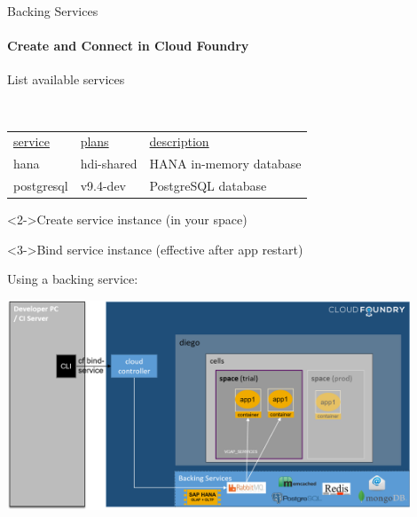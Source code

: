 \begin{frame}[fragile]{Backing Services}
\framesubtitle{Create and Connect in Cloud Foundry}
\begin{block}{List available services}

\tt
\begin{tabular}[h]{lll}
\underline{service} & \underline{plans} & \underline{description} \\
hana            & hdi-shared & HANA in-memory database\\
\alert<2>{postgresql} & \alert<2>{v9.4-dev}       & PostgreSQL database\\
\end{tabular}
\end{block}

\begin{block}<2->{Create service instance (in your space)} 
\end{block}

\begin{block}<3->{Bind service instance (effective after app restart)}
\\
\end{block}

\end{frame}

\begin{frame}{Using a backing service: }
\begin{center}
	\includegraphics[width=0.9\textwidth]{../ConnectDatabase/images/CF_Basics_7_backing}
\end{center}
\end{frame}

